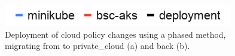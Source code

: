 \documentclass[../main.tex]{subfiles}
\begin{document}
    \begin{figure}[t]
        \centering
        \includegraphics[width=.4\linewidth]{img/res-deploy-label.png}
        \captionsetup{justification=centering}
        \caption{
            Deployment of \gls{cloud} policy changes using a phased method, migrating from  to \gls{private_cloud} (a) and back (b).
        }
        \label{fig:res_deploy_phased}
    \end{figure}
\end{document}
